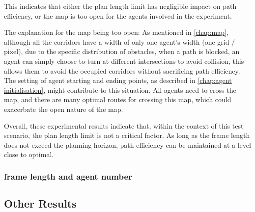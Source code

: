 \begin{itemize}
    This indicates that either the plan length limit has negligible impact on path efficiency, or the map is too open for the agents involved in the experiment. 

    The explanation for the map being too open: 
    As mentioned in \ref{chap:map}, although all the corridors have a width of only one agent's width (one grid / pixel), due to the specific distribution of obstacles, 
    when a path is blocked, an agent can simply choose to turn at different intersections to avoid collision, 
    this allows them to avoid the occupied corridors without sacrificing path efficiency.
    The setting of agent starting and ending points, as described in \ref{chap:agent initialisation}, might contribute to this situation. All agents need to cross the map, and there are many optimal routes for crossing this map, which could exacerbate the open nature of the map.
\end{itemize}

Overall, these experimental results indicate that, within the context of this test scenario, the plan length limit is not a critical factor. As long as the frame length does not exceed the planning horizon, path efficiency can be maintained at a level close to optimal.

\subsubsection{frame length and agent number}


\subsection{Other Results}
